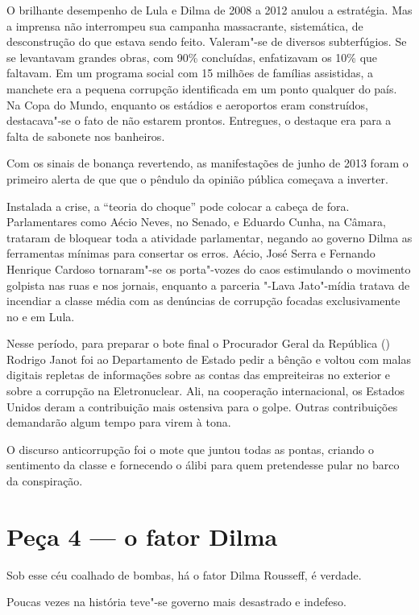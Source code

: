 O brilhante desempenho de Lula e Dilma de 2008 a 2012 anulou a
estratégia. Mas a imprensa não interrompeu sua campanha massacrante,
sistemática, de desconstrução do que estava sendo feito. Valeram"-se de
diversos subterfúgios. Se se levantavam grandes obras, com 90\%
concluídas, enfatizavam os 10\% que faltavam. Em um programa social com
15 milhões de famílias assistidas, a manchete era a pequena corrupção
identificada em um ponto qualquer do país. Na Copa do Mundo, enquanto os
estádios e aeroportos eram construídos, destacava"-se o fato de não
estarem prontos. Entregues, o destaque era para a falta de sabonete nos
banheiros.

Com os sinais de bonança revertendo, as manifestações de junho de 2013
foram o primeiro alerta de que que o pêndulo da opinião pública começava
a inverter.

Instalada a crise, a ``teoria do choque'' pode colocar a cabeça de fora.
Parlamentares como Aécio Neves, no Senado, e Eduardo Cunha, na Câmara,
trataram de bloquear toda a atividade parlamentar, negando ao governo
Dilma as ferramentas mínimas para consertar os erros. Aécio, José Serra
e Fernando Henrique Cardoso tornaram"-se os porta"-vozes do caos
estimulando o movimento golpista nas ruas e nos jornais, enquanto a
parceria "-Lava Jato"-mídia tratava de incendiar a classe média com as
denúncias de corrupção focadas exclusivamente no  e em Lula.

Nesse período, para preparar o bote final o Procurador Geral da
República () Rodrigo Janot foi ao Departamento de Estado pedir a
bênção e voltou com malas digitais repletas de informações sobre as
contas das empreiteiras no exterior e sobre a corrupção na
Eletronuclear. Ali, na cooperação internacional, os Estados Unidos deram
a contribuição mais ostensiva para o golpe. Outras contribuições
demandarão algum tempo para virem à tona.

O discurso anticorrupção foi o mote que juntou todas as pontas, criando
o sentimento da classe e fornecendo o álibi para quem pretendesse pular
no barco da conspiração.

\section{Peça 4 --- o fator Dilma}

Sob esse céu coalhado de bombas, há o fator Dilma Rousseff, é verdade.

Poucas vezes na história teve"-se governo mais desastrado e indefeso.

